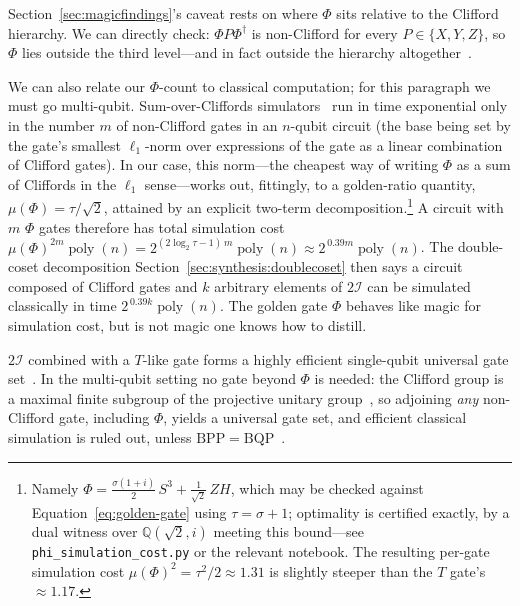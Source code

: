 \documentclass[11pt, oneside, openany]{scrbook}
\newcommand{\Igroup}{\mathcal{I}}  %
\newcommand{\TwoI}{2\Igroup}
\newcommand{\phig}{\tau} %
\newcommand{\invphig}{\sigma} %
\begin{document}
Section~\ref{sec:magicfindings}'s caveat rests on where $\Phi$ sits relative to the Clifford hierarchy. We can directly check: $\Phi P \Phi^\dagger$ is non-Clifford for every $P \in \{X, Y, Z\}$, so $\Phi$ lies outside the third level---and in fact outside the hierarchy altogether~\cite{kubischta2023familyquantumcodes}.

We can also relate our $\Phi$-count to classical computation; for this paragraph we must go multi-qubit. Sum-over-Cliffords simulators~\cite{bravyi2019simulationquantumcircuits} run in time exponential only in the number $m$ of non-Clifford gates in an $n$-qubit circuit (the base being set by the gate's smallest $\ell_1$-norm over expressions of the gate as a linear combination of Clifford gates). In our case, this norm---the cheapest way of writing $\Phi$ as a sum of Cliffords in the $\ell_1$ sense---works out, fittingly, to a golden-ratio quantity, $\mu(\Phi) = \phig/\sqrt{2}$, attained by an explicit two-term decomposition.\footnote{Namely $\Phi = \frac{\invphig(1+i)}{2}\,S^3 + \frac{1}{\sqrt{2}}\,ZH$, which may be checked against Equation~\eqref{eq:golden-gate} using $\phig = \invphig + 1$; optimality is certified exactly, by a dual witness over $\mathbb{Q}(\sqrt{2}, i)$ meeting this bound---see \texttt{phi\_simulation\_cost.py} or the relevant notebook. The resulting per-gate simulation cost $\mu(\Phi)^2 = \phig^2/2 \approx 1.31$ is slightly steeper than the $T$ gate's $\approx 1.17$.} A circuit with $m$ $\Phi$ gates therefore has total simulation cost $\mu(\Phi)^{2m}\operatorname{poly}(n) = 2^{(2\log_2\phig - 1)\,m}\operatorname{poly}(n) \approx 2^{\,0.39m}\operatorname{poly}(n)$. The double-coset decomposition Section~\ref{sec:synthesis:doublecoset} then says a circuit composed of Clifford gates and $k$ arbitrary elements of $\TwoI$ can be simulated classically in time $2^{\,0.39k}\operatorname{poly}(n)$. The golden gate $\Phi$ behaves like magic for simulation cost, but is not magic one knows how to distill.

$\TwoI$ combined with a $T$-like gate forms a highly efficient single-qubit universal gate set~\cite{parzanchevski2018supergoldengatespu2,blackman2022fastnavigationicosahedral}. In the multi-qubit setting no gate beyond $\Phi$ is needed: the Clifford group is a maximal finite subgroup of the projective unitary group~\cite[Thm.~6.5]{nebe2000invariantscliffordgroups}, so adjoining \textit{any} non-Clifford gate, including $\Phi$, yields a universal gate set, and efficient classical simulation is ruled out, unless $\mathrm{BPP} = \mathrm{BQP}$~\cite{nielsen2010quantumcomputationquantum}.
\end{document}
